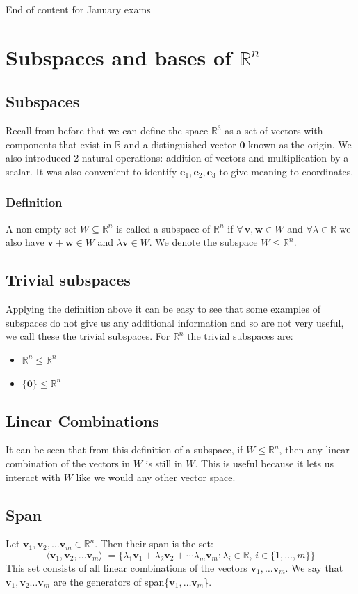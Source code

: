 \documentclass[12pt]{article}
\begin{document}
\hrulefill
\begin{center}
End of content for January exams
\end{center}
\hrulefill
\section{Subspaces and bases of \(\mathbb{R}^n\)}
\subsection*{Subspaces}
Recall from before that we can define the space \(\mathbb{R}^3\) as a set of vectors with components that exist in \(\mathbb{R}\) and a distinguished vector \(\textbf{0}\) known as the origin. We also introduced 2 natural operations: addition of vectors and multiplication by a scalar. It was also convenient to identify \(\textbf{e}_1,\textbf{e}_2,\textbf{e}_3\) to give meaning to coordinates.
\subsubsection*{Definition}
A non-empty set \(W\subseteq \mathbb{R}^n\) is called a subspace of \(\mathbb{R}^n\) if \(\forall\,\textbf{v},\textbf{w}\in W\) and \(\forall\lambda\in\mathbb{R}\) we also have \(\textbf{v}+\textbf{w}\in W\) and \(\lambda \textbf{v}\in W\). We denote the subspace \(W\leqslant \mathbb{R}^n\).
\subsection*{Trivial subspaces}
Applying the definition above it can be easy to see that some examples of subspaces do not give us any additional information and so are not very useful, we call these the trivial subspaces. For \(\mathbb{R}^n\) the trivial subspaces are:
\begin{itemize}
    \item \(\mathbb{R}^n\leqslant \mathbb{R}^n\)
    \item \(\{\textbf{0}\}\leqslant \mathbb{R}^n\)
\end{itemize}
\subsection*{Linear Combinations}
It can be seen that from this definition of a subspace, if \(W\leqslant\mathbb{R}^n\), then any linear combination of the vectors in \(W\) is still in \(W\). This is useful because it lets us interact with \(W\) like we would any other vector space.
\subsection*{Span}
Let \(\textbf{v}_1,\textbf{v}_2,\dots\textbf{v}_m\in\mathbb{R}^n\). Then their span is the set:
\[\langle\textbf{v}_1,\textbf{v}_2,\dots\textbf{v}_m\rangle\;=\{\lambda_1\textbf{v}_1+\lambda_2\textbf{v}_2+\cdots\lambda_m\textbf{v}_m: \lambda_i\in\mathbb{R},\,i\in\{1,\dots,m\}\}\]
This set consists of all linear combinations of the vectors \(\textbf{v}_1,\dots\textbf{v}_m\). We say that \(\textbf{v}_1,\textbf{v}_2\dots\textbf{v}_m\) are the generators of span\{\(\textbf{v}_1,\dots\textbf{v}_m\)\}.
\end{document}
